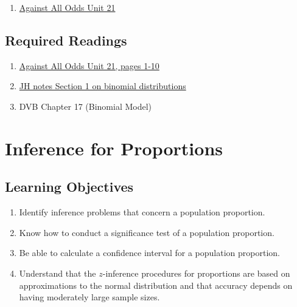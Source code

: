 \documentclass[letterpaper,10pt,twocolumn,twoside,printwatermark=false]{pinp}
\providecommand{\tightlist}{%
  \setlength{\itemsep}{0pt}\setlength{\parskip}{0pt}}
\begin{document}
\begin{enumerate}
\def\labelenumi{\arabic{enumi}.}
\tightlist
\item
  \href{https://www.learner.org/courses/againstallodds/unitpages/unit21.html}{Against
  All Odds Unit 21}
\end{enumerate}

\hypertarget{required-readings-3}{%
\subsection{Required Readings}\label{required-readings-3}}

\begin{enumerate}
\item \href{https://www.learner.org/courses/againstallodds/pdfs/AgainstAllOdds_StudentGuide_Unit21.pdf#page=1}{Against All Odds Unit 21, pages 1-10}
\item \href{https://www.dropbox.com/s/g1ui3xg8nup1p6b/proportion-model-inference-plan-2018.pdf?dl=0}{JH notes Section 1 on binomial distributions}
\item DVB Chapter 17 (Binomial Model)
\end{enumerate}

\vspace*{0.25cm}

\hypertarget{inference-for-proportions}{%
\section{Inference for Proportions}\label{inference-for-proportions}}

\hypertarget{learning-objectives-4}{%
\subsection{Learning Objectives}\label{learning-objectives-4}}

\begin{enumerate}
\def\labelenumi{\arabic{enumi}.}
\tightlist
\item
  Identify inference problems that concern a population proportion.
\item
  Know how to conduct a significance test of a population proportion.
\item
  Be able to calculate a confidence interval for a population
  proportion.
\item
  Understand that the \(z\)-inference procedures for proportions are
  based on approximations to the normal distribution and that accuracy
  depends on having moderately large sample sizes.
\end{enumerate}
\end{document}
